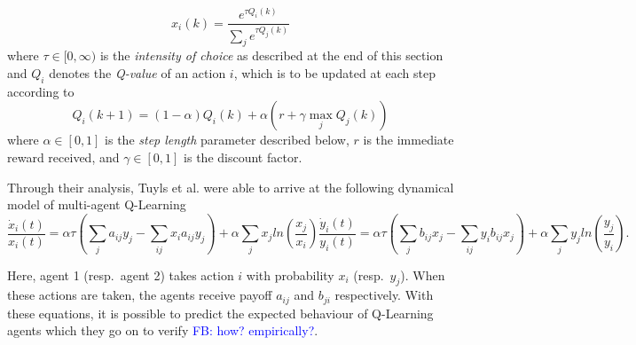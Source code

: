 \documentclass[sigconf,anonymous]{aamas}
\newcommand\fb[1]{\textcolor{blue}{FB: #1}}
\begin{document}
\begin{equation}
    x_i(k) = \frac{e^{\tau Q_i(k)}}{\sum_j e^{\tau Q_j(k)}}
\end{equation}
%
where $\tau \in [0, \infty)$ is the \textit{intensity of choice} as described at the end of this section and $Q_i$ denotes the \textit{Q-value} of an action $i$, which is to be updated at each step according to
%
\begin{equation}
\label{eqn::Qupdate}
    Q_i(k+1) = (1 - \alpha) Q_i(k) + \alpha (r + \gamma \max_j Q_j(k))
\end{equation}
%
where $\alpha \in [0, 1]$ is the \textit{step length} parameter described below, $r$ is the immediate reward received, and $\gamma \in [0, 1]$ is the discount factor.

Through their analysis, Tuyls et al. were able to
arrive at the following dynamical model of multi-agent Q-Learning
%
\begin{subequations}
\label{eqn::EOM}
    \begin{equation}
        \frac{\dot{x}_i(t)}{x_i(t)} = \alpha \tau (\sum_{j} a_{ij} y_j - \sum_{i j} x_i a_{ij} y_j)
        + \alpha \sum_j x_j ln(\frac{x_j}{x_i}) 
    \end{equation}
    \begin{equation}
        \frac{\dot{y}_i(t)}{y_i(t)} = \alpha \tau (\sum_{j} b_{ij} x_j - \sum_{i j} y_i b_{ij} x_j)
        + \alpha \sum_j y_j ln(\frac{y_j}{y_i}).
    \end{equation}
\end{subequations}

Here,
agent 1 (resp.~agent 2) takes action $i$ with probability
$x_i$ (resp.~$y_j$).
When these actions are taken, the agents
receive payoff $a_{ij}$ and $b_{ji}$ respectively. With these equations, it is possible to
predict the expected behaviour of Q-Learning agents which they go on to verify \fb{how? empirically?}.
\end{document}
